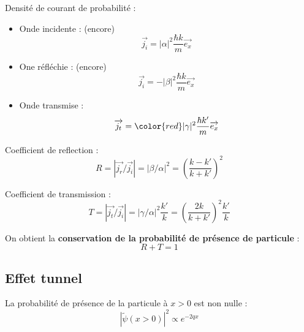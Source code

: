 Densité de courant de probabilité : 
\begin{itemize}

    \item Onde incidente : (encore) 
      \begin{equation}
        \overrightarrow{j_i} = |\alpha | ^{2} \frac{\hbar k}{m}  \overrightarrow{e_x}
      \end{equation}

    \item One réfléchie : (encore) 
      \begin{equation}
        \overrightarrow{j_i} = -|\beta | ^{2} \frac{\hbar k}{m}  \overrightarrow{e_x}
      \end{equation}

    \item Onde transmise : 
      \begin{equation}
        \overrightarrow{j_t} = {\color{red} |\gamma| ^{2} \frac{\hbar k '}{m} \overrightarrow{e_x} } 
      \end{equation}
\end{itemize}

Coefficient de reflection : \begin{equation}
 R = | \overrightarrow{j_r} / \overrightarrow{j_i} | = | \beta / \alpha | ^{2} = \left( \frac{k-k'}{k+k'}  \right) ^{2}
\end{equation}

Coefficient de transmission : \begin{equation}
  T = | \overrightarrow{j_t} / \overrightarrow{j_i} | = | \gamma / \alpha | ^{2} \frac{k'}{k}  = \left( \frac{2k}{k+k '}  \right) ^{2} \frac{k'}{k} 
\end{equation}

On obtient la \textbf{conservation de la probabilité de présence de particule} : 
\begin{equation}
  R+ T = 1
\end{equation}


\subsection{Effet tunnel} %
\label{sub:Effet tunnel}

La probabilité de présence de la particule à $x > 0$ est non nulle : 
\begin{equation}
  | \widetilde{\psi} (x>0) | ^{2} \propto e ^{-2qx}
\end{equation}

